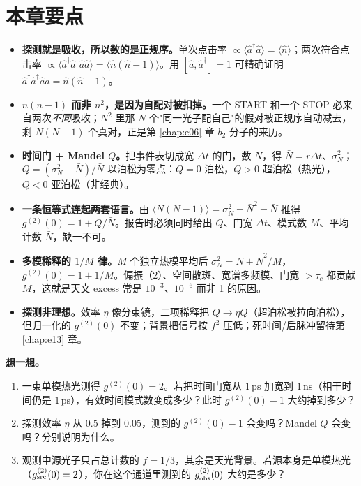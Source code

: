 \section{本章要点}
\label{sec:e07-summary}

\begin{itemize}
  \item \textbf{探测就是吸收，所以数的是正规序。}单次点击率 \(\propto\langle\hat a^\dagger\hat a\rangle=\langle\hat n\rangle\)；两次符合点击率 \(\propto\langle\hat a^\dagger\hat a^\dagger\hat a\hat a\rangle=\langle\hat n(\hat n-1)\rangle\)。用 \([\hat a,\hat a^\dagger]=1\) 可精确证明 \(\hat a^\dagger\hat a^\dagger\hat a\hat a=\hat n(\hat n-1)\)。
  \item \textbf{\(n(n-1)\) 而非 \(n^2\)，是因为自配对被扣掉。}一个 START 和一个 STOP 必来自两次\emph{不同}吸收；\(N^2\) 里那 \(N\) 个"同一光子配自己"的假对被正规序自动减去，剩 \(N(N-1)\) 个真对，正是第 \ref{chap:e06} 章 \(b_2\) 分子的来历。
  \item \textbf{时间门 + Mandel \(Q\)。}把事件表切成宽 \(\Delta t\) 的门，数 \(N\)，得 \(\bar N=r\Delta t\)、\(\sigma_N^2\)；\(Q=(\sigma_N^2-\bar N)/\bar N\) 以泊松为零点：\(Q=0\) 泊松，\(Q>0\) 超泊松（热光），\(Q<0\) 亚泊松（非经典）。
  \item \textbf{一条恒等式连起两套语言。}由 \(\langle N(N-1)\rangle=\sigma_N^2+\bar N^2-\bar N\) 推得 \(g^{(2)}(0)=1+Q/\bar N\)。报告时必须同时给出 \(Q\)、门宽 \(\Delta t\)、模式数 \(M\)、平均计数 \(\bar N\)，缺一不可。
  \item \textbf{多模稀释的 \(1/M\) 律。}\(M\) 个独立热模平均后 \(\sigma_N^2=\bar N+\bar N^2/M\)，\(g^{(2)}(0)=1+1/M\)。偏振（2）、空间散斑、宽谱多频模、门宽 \(>\tau_c\) 都贡献 \(M\)，这就是天文 excess 常是 \(10^{-3}\)、\(10^{-6}\) 而非 1 的原因。
  \item \textbf{探测非理想。}效率 \(\eta\) 像分束镜，二项稀释把 \(Q\to\eta Q\)（超泊松被拉向泊松），但归一化的 \(g^{(2)}(0)\) 不变；背景把信号按 \(f^2\) 压低；死时间/后脉冲留待第 \ref{chap:e13} 章。
\end{itemize}

\medskip
\noindent\textbf{想一想。}
\begin{enumerate}
  \item 一束单模热光测得 \(g^{(2)}(0)=2\)。若把时间门宽从 \(1\,\mathrm{ps}\) 加宽到 \(1\,\mathrm{ns}\)（相干时间仍是 \(1\,\mathrm{ps}\)），有效时间模式数变成多少？此时 \(g^{(2)}(0)-1\) 大约掉到多少？
  \item 探测效率 \(\eta\) 从 \(0.5\) 掉到 \(0.05\)，测到的 \(g^{(2)}(0)-1\) 会变吗？Mandel \(Q\) 会变吗？分别说明为什么。
  \item 观测中源光子只占总计数的 \(f=1/3\)，其余是天光背景。若源本身是单模热光（\(g^{(2)}_{\rm src}(0)=2\)），你在这个通道里测到的 \(g^{(2)}_{\rm obs}(0)\) 大约是多少？
\end{enumerate}
